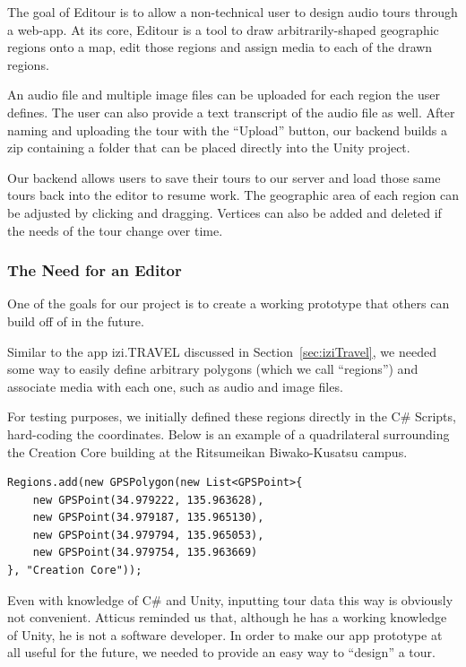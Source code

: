 \documentclass[a4paper, 10pt, american, titlepage]{article}
\begin{document}
The goal of Editour is to allow a non-technical user to design audio tours
through a web-app. At its core, Editour is a tool to draw arbitrarily-shaped
geographic regions onto a map, edit those regions and assign media to each of
the drawn regions.

An audio file and multiple image files can be uploaded for each region the user
defines. The user can also provide a text transcript of the audio file as well.
After naming and uploading the tour with the ``Upload'' button, our backend
builds a zip containing a folder that can be placed directly into the Unity
project.

Our backend allows users to save their tours to our server and load those same
tours back into the editor to resume work.  The geographic area of each region
can be adjusted by clicking and dragging. Vertices can also be added and
deleted if the needs of the tour change over time.

\subsubsection{The Need for an Editor}
\label{sec:theNeedForAnEditor}

One of the goals for our project is to create a working prototype that others
can build off of in the future.

Similar to the app izi.TRAVEL discussed in Section~\ref{sec:iziTravel}, we
needed some way to easily define arbitrary polygons (which we call ``regions'')
and associate media with each one, such as audio and image files.

For testing purposes, we initially defined these regions directly in the C\#
Scripts, hard-coding the coordinates. Below is an example of a quadrilateral
surrounding the Creation Core building at the Ritsumeikan Biwako-Kusatsu campus.

\begin{verbatim}
Regions.add(new GPSPolygon(new List<GPSPoint>{
    new GPSPoint(34.979222, 135.963628),
    new GPSPoint(34.979187, 135.965130),
    new GPSPoint(34.979794, 135.965053),
    new GPSPoint(34.979754, 135.963669)
}, "Creation Core"));
\end{verbatim}

Even with knowledge of C\# and Unity, inputting tour data this way is obviously
not convenient. Atticus reminded us that, although he has a working knowledge of
Unity, he is not a software developer. In order to make our app prototype at all
useful for the future, we needed to provide an easy way to ``design'' a tour.
\end{document}
